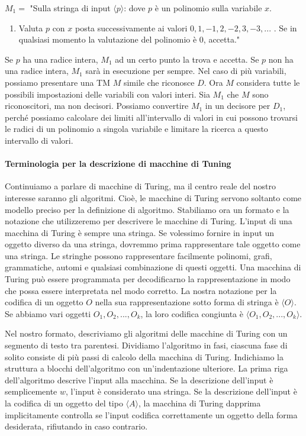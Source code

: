 \documentclass{article}
\begin{document}
$M_1 = $ "Sulla stringa di input $\langle p \rangle$: dove $p$ è un polinomio sulla variabile $x$.
\begin{enumerate}
    \item Valuta $p$ con $x$ posta successivamente ai valori $0,1,-1,2,-2,3,-3,...$ . Se in qualsiasi momento la valutazione del polinomio è 0, accetta."
\end{enumerate}

Se $p$ ha una radice intera, $M_1$ ad un certo punto la trova e accetta. 
Se $p$ non ha una radice intera, $M_1$ sarà in esecuzione per sempre. 
Nel caso di più variabili, possiamo presentare una TM $M$ simile che riconosce $D$. 
Ora $M$ considera tutte le possibili impostazioni delle variabili con valori interi.
Sia $M_1$ che $M$ sono riconoscitori, ma non decisori. 
Possiamo convertire $M_1$ in un decisore per $D_1$, perché possiamo calcolare dei limiti all'intervallo di valori in cui possono trovarsi le radici di un polinomio a singola variabile e limitare la ricerca a questo intervallo di valori. 

\paragraph{Terminologia per la descrizione di macchine di Tuning}
\label{def:terminology_turing_machine}
\text{ }

Continuiamo a parlare di macchine di Turing, ma il centro reale del nostro interesse saranno gli algoritmi. 
Cioè, le macchine di Turing servono soltanto come modello preciso per la definizione di algoritmo. 
Stabiliamo ora un formato e la notazione che utilizzeremo per descrivere le macchine di Turing. 
L'input di una macchina di Turing è sempre una stringa. 
Se volessimo fornire in input un oggetto diverso da una stringa, dovremmo prima rappresentare tale oggetto come una stringa.
Le stringhe possono rappresentare facilmente polinomi, grafi, grammatiche, automi e qualsiasi combinazione di questi oggetti.
Una macchina di Turing può essere programmata per decodificarno la rappresentazione in modo che possa essere interpretata nel modo corretto.
La nostra notazione per la codifica di un oggetto $O$ nella sua rappresentazione sotto forma di stringa è $\langle O \rangle$.
Se abbiamo vari oggetti $O_1,O_2,...,O_k$, la loro codifica congiunta è $\langle O_1,O_2,...,O_k \rangle$.

Nel nostro formato, descriviamo gli algoritmi delle macchine di Turing con un segmento di testo tra parentesi. 
Dividiamo l'algoritmo in fasi, ciascuna fase di solito consiste di più passi di calcolo della macchina di Turing.
Indichiamo la struttura a blocchi dell'algoritmo con un'indentazione ulteriore. 
La prima riga dell'algoritmo descrive l'input alla macchina. 
Se la descrizione dell'input è semplicemente $w$, l'input è considerato una stringa. 
Se la descrizione dell'input è la codifica di un oggetto del tipo $\langle A \rangle$, la macchina di Turing dapprima implicitamente controlla se l'input codifica correttamente un oggetto della forma desiderata, rifiutando in caso contrario.
\end{document}
